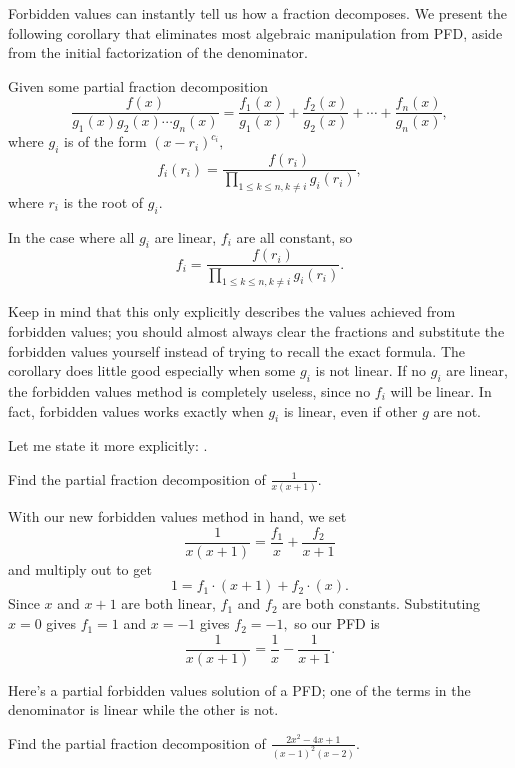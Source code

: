 \documentclass[blue,onecol]{shooting}
\begin{document}
Forbidden values can instantly tell us how a fraction decomposes. We present the following corollary that eliminates most algebraic manipulation from PFD, aside from the initial factorization of the denominator.

\begin{corollary}
Given some partial fraction decomposition
\[\frac{f(x)}{g_1(x)g_2(x)\cdots g_n(x)}=\frac{f_1(x)}{g_1(x)}+\frac{f_2(x)}{g_2(x)}+\cdots+\frac{f_n(x)}{g_n(x)},\] where $g_i$ is of the form $(x-r_i)^{c_i},$
\[f_i(r_i)=\frac{f(r_i)}{\prod\limits_{1\leq k\leq n, k\neq i}g_i(r_i)},\] where $r_i$ is the root of $g_i.$

In the case where all $g_i$ are linear, $f_i$ are all constant, so \[f_i=\frac{f(r_i)}{\prod\limits_{1\leq k\leq n,k\neq i}g_i(r_i)}.\]
\end{corollary}

Keep in mind that this only explicitly describes the values achieved from forbidden values; you should almost always clear the fractions and substitute the forbidden values yourself instead of trying to recall the exact formula. The corollary does little good especially when some $g_i$ is not linear. If no $g_i$ are linear, the forbidden values method is completely useless, since no $f_i$ will be linear. In fact, forbidden values works exactly when $g_i$ is linear, even if other $g$ are not.

Let me state it more explicitly: .

\begin{exam}
Find the partial fraction decomposition of $\frac{1}{x(x+1)}.$
\end{exam}

\begin{sol}
With our new forbidden values method in hand, we set
\[\frac{1}{x(x+1)}=\frac{f_1}{x}+\frac{f_2}{x+1}\]
and multiply out to get
\[1=f_1\cdot (x+1)+f_2\cdot (x).\]
Since $x$ and $x+1$ are both linear, $f_1$ and $f_2$ are both constants. Substituting $x=0$ gives $f_1=1$ and $x=-1$ gives $f_2=-1,$ so our PFD is
\[\frac{1}{x(x+1)}=\frac{1}{x}-\frac{1}{x+1}.\]
\end{sol}

Here's a partial forbidden values solution of a PFD; one of the terms in the denominator is linear while the other is not.

\begin{exam}
Find the partial fraction decomposition of $\frac{2x^2-4x+1}{(x-1)^2(x-2)}.$
\end{exam}
\end{document}
